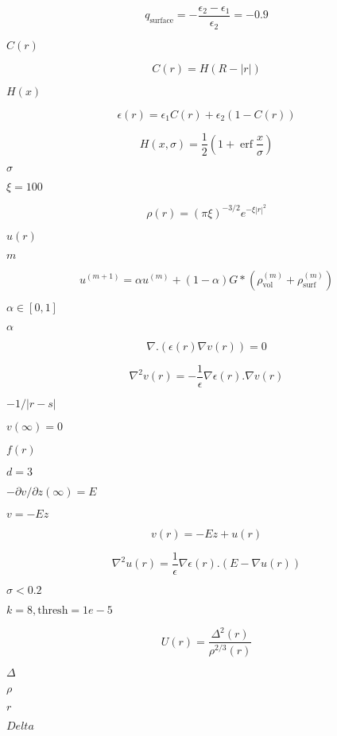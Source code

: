 \documentclass{article}
\begin{document}
\[
   q_{\mbox{surface}} = -\frac{\epsilon_2 - \epsilon_1}{\epsilon_2} = -0.9
\]
\pagebreak

$C(r)$
\pagebreak

\[
  C(r) = H(R-|r|)
\]
\pagebreak

$H(x)$
\pagebreak

\[
   \epsilon(r) = \epsilon_1 C(r) + \epsilon_2 \left( 1 - C(r) \right)
\]
\pagebreak

\[
   H(x,\sigma) = \frac{1}{2} \left( 1 + \mathop{\mathrm{erf}} \frac{x}{\sigma} \right)
\]
\pagebreak

$\sigma$
\pagebreak

$\xi=100$
\pagebreak

\[
   \rho(r) = \left(\pi \xi \right)^{-3/2} e^{-\xi |r|^2}
\]
\pagebreak

$u(r)$
\pagebreak

$m$
\pagebreak

\[
   u^{(m+1)} = \alpha u^{(m)} + (1-\alpha) G * \left(\rho^{(m)}_{\mbox{vol}} + \rho^{(m)}_{\mbox{surf}} \right)
\]
\pagebreak

$ \alpha \in [0,1]$
\pagebreak

$\alpha$
\pagebreak

\[
\nabla . \left( \epsilon(r) \nabla v(r)  \right) = 0
\]
\pagebreak

\[
   \nabla^2 v(r) = - \frac{1}{\epsilon} \nabla \epsilon(r) .  \nabla v(r)
\]
\pagebreak

$-1 / |r-s|$
\pagebreak

$v(\infty)=0$
\pagebreak

$f(r)$
\pagebreak

$d=3$
\pagebreak

$- \partial v / \partial z(\infty) = E$
\pagebreak

$v = - E z$
\pagebreak

\[
v(r) = - E z + u(r)
\]
\pagebreak

\[
   \nabla^2 u(r) = \frac{1}{\epsilon} \nabla \epsilon(r) .  \left(E - \nabla u(r) \right)
\]
\pagebreak

$\sigma<0.2$
\pagebreak

$k=8, \mbox{thresh}=1e-5$
\pagebreak

\[
U(r) = \frac{\Delta^2 (r)}{\rho^{2/3} (r)}
\]
\pagebreak

$ \Delta $
\pagebreak

$ \rho $
\pagebreak

$ r $
\pagebreak

$ Delta $
\pagebreak
\end{document}
